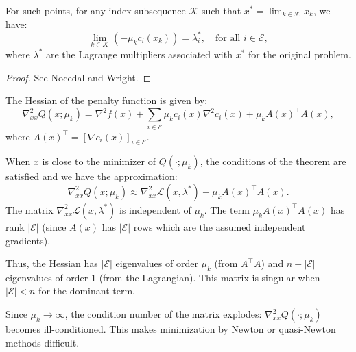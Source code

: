 \begin{remarque}
    For such points, for any index subsequence $\mathcal{K}$ such that $x^* = \lim_{k \in \mathcal{K}} x_k$, we have:
    \[
        \lim_{k \in \mathcal{K}} (-\mu_k c_i(x_k)) = \lambda_i^*, \quad \text{for all } i \in \mathcal{E},
    \]
    where $\lambda^*$ are the Lagrange multipliers associated with $x^*$ for the original problem.
    \begin{proof}
        See Nocedal and Wright.
    \end{proof}
\end{remarque}

\begin{remarque}
    The Hessian of the penalty function is given by:
    \[
        \nabla_{xx}^2 Q(x; \mu_k) = \nabla^2 f(x) + \sum_{i \in \mathcal{E}} \mu_k c_i(x) \nabla^2 c_i(x) + \mu_k A(x)^\top A(x),
    \]
    where $A(x)^\top = [\nabla c_i(x)]_{i \in \mathcal{E}}$.
    
    When $x$ is close to the minimizer of $Q(\cdot; \mu_k)$, the conditions of the theorem are satisfied and we have the approximation:
    \[
        \nabla_{xx}^2 Q(x; \mu_k) \approx \nabla_{xx}^2 \mathcal{L}(x, \lambda^*) + \mu_k A(x)^\top A(x).
    \]
    The matrix $\nabla_{xx}^2 \mathcal{L}(x, \lambda^*)$ is independent of $\mu_k$.
    The term $\mu_k A(x)^\top A(x)$ has rank $|\mathcal{E}|$ (since $A(x)$ has $|\mathcal{E}|$ rows which are the assumed independent gradients).
    
    Thus, the Hessian has $|\mathcal{E}|$ eigenvalues of order $\mu_k$ (from $A^\top A$) and $n - |\mathcal{E}|$ eigenvalues of order 1 (from the Lagrangian).
    This matrix is singular when $|\mathcal{E}| < n$ for the dominant term.
    
    Since $\mu_k \to \infty$, the condition number of the matrix explodes: $\nabla_{xx}^2 Q(\cdot; \mu_k)$ becomes ill-conditioned. This makes minimization by Newton or quasi-Newton methods difficult.
\end{remarque}

